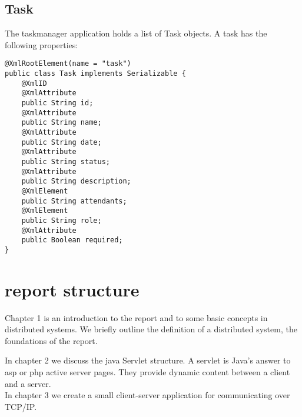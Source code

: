 \subsection{Task}
The taskmanager application holds a list of Task objects. A task has the following properties:\\

\begin{comment}
ID (a unique identifier), name (the name of the task), date (the date of creation), status (status of the task. E.g executed or non-executed.),
required (E.g. ?true? or ?false?.?), role (role, is an access control technique in where the role of a task signifies the access rights level of that task. ), Attendants (a list of attendants for the task)\\
\end{comment}


\begin{lstlisting}[caption=Task]
@XmlRootElement(name = "task")
public class Task implements Serializable {
    @XmlID
    @XmlAttribute
    public String id;
    @XmlAttribute
    public String name;
    @XmlAttribute
    public String date;
    @XmlAttribute
    public String status;
    @XmlAttribute
    public String description;
    @XmlElement
    public String attendants;
    @XmlElement
    public String role;
    @XmlAttribute
    public Boolean required;
}

\end{lstlisting}

\section{report structure}

Chapter 1 is an introduction to the report and to some basic concepts in distributed systems. We briefly outline the definition of a distributed system, the foundations of the report. \\

\begin{comment}
A server client structure is implemented and we discuss the intricacies of java Servlets and JDOM. \\	
\end{comment}

In chapter 2 we discuss the java Servlet structure. A servlet is Java's answer to asp or php active server pages. They provide dynamic content between a client and a server. \\ 

In chapter 3 we create a small client-server application for communicating over TCP/IP. \\

